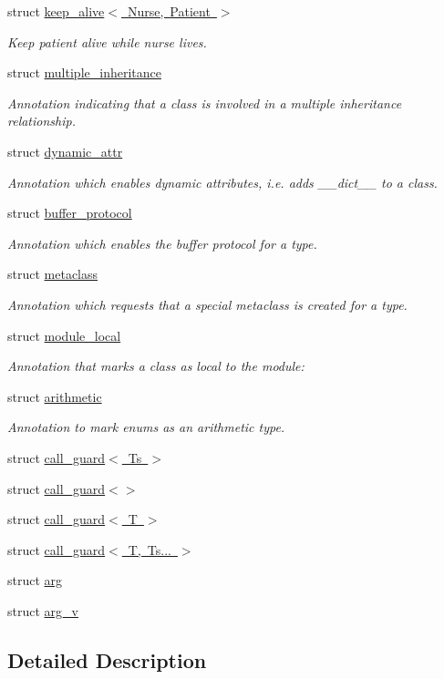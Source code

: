\begin{DoxyCompactItemize}
struct \mbox{\hyperlink{structkeep__alive}{keep\+\_\+alive$<$ Nurse, Patient $>$}}
\begin{DoxyCompactList}\small\item\em Keep patient alive while nurse lives. \end{DoxyCompactList}\item 
struct \mbox{\hyperlink{structmultiple__inheritance}{multiple\+\_\+inheritance}}
\begin{DoxyCompactList}\small\item\em Annotation indicating that a class is involved in a multiple inheritance relationship. \end{DoxyCompactList}\item 
struct \mbox{\hyperlink{structdynamic__attr}{dynamic\+\_\+attr}}
\begin{DoxyCompactList}\small\item\em Annotation which enables dynamic attributes, i.\+e. adds {\ttfamily \+\_\+\+\_\+dict\+\_\+\+\_\+} to a class. \end{DoxyCompactList}\item 
struct \mbox{\hyperlink{structbuffer__protocol}{buffer\+\_\+protocol}}
\begin{DoxyCompactList}\small\item\em Annotation which enables the buffer protocol for a type. \end{DoxyCompactList}\item 
struct \mbox{\hyperlink{structmetaclass}{metaclass}}
\begin{DoxyCompactList}\small\item\em Annotation which requests that a special metaclass is created for a type. \end{DoxyCompactList}\item 
struct \mbox{\hyperlink{structmodule__local}{module\+\_\+local}}
\begin{DoxyCompactList}\small\item\em Annotation that marks a class as local to the module\+: \end{DoxyCompactList}\item 
struct \mbox{\hyperlink{structarithmetic}{arithmetic}}
\begin{DoxyCompactList}\small\item\em Annotation to mark enums as an arithmetic type. \end{DoxyCompactList}\item 
struct \mbox{\hyperlink{structcall__guard}{call\+\_\+guard$<$ Ts $>$}}
\item 
struct \mbox{\hyperlink{structcall__guard_3_4}{call\+\_\+guard$<$$>$}}
\item 
struct \mbox{\hyperlink{structcall__guard_3_01_t_01_4}{call\+\_\+guard$<$ T $>$}}
\item 
struct \mbox{\hyperlink{structcall__guard_3_01_t_00_01_ts_8_8_8_01_4}{call\+\_\+guard$<$ T, Ts... $>$}}
\item 
struct \mbox{\hyperlink{structarg}{arg}}
\item 
struct \mbox{\hyperlink{structarg__v}{arg\+\_\+v}}
\end{DoxyCompactItemize}


\subsection{Detailed Description}

